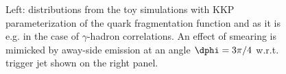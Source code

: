 \begin{figure}[htbp]
   \caption{Left: \xe{} distributions from the toy simulations with KKP parameterization  of the quark  fragmentation function and 
    as it is e.g. in the case of $\gamma$-hadron correlations. An effect of \kt{} smearing is mimicked by away-side emission 
    at an angle $\dphi = 3\pi/4$ w.r.t. trigger jet shown on the right panel.}  
\end{figure}
\begin{figure}[htbp]
   \centering

\end{figure}

